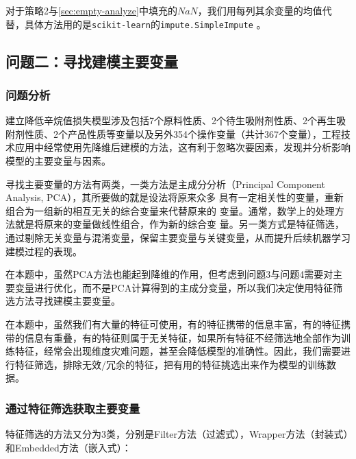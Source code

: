 \documentclass[bwprint]{gmcmthesis}
\begin{document}
对于策略2与\ref{sec:empty-analyze}中填充的$NaN$，我们用每列其余变量的均值代替，具体方法用的是\texttt{scikit-learn}的\texttt{impute.SimpleImpute} 。

\FloatBarrier
\subsection{问题二：寻找建模主要变量}
\FloatBarrier
\subsubsection{问题分析}

建立降低辛烷值损失模型涉及包括7个原料性质、2个待生吸附剂性质、2个再生吸附剂性质、2个产品性质等变量以及另外354个操作变量（共计367个变量），工程技术应用中经常使用先降维后建模的方法，这有利于忽略次要因素，发现并分析影响模型的主要变量与因素。

寻找主要变量的方法有两类，一类方法是主成分分析（Principal Component Analysis, PCA），其所要做的就是设法将原来众多
具有一定相关性的变量，重新组合为一组新的相互无关的综合变量来代替原来的
变量。通常，数学上的处理方法就是将原来的变量做线性组合，作为新的综合变
量。另一类方式是特征筛选，通过剔除无关变量与混淆变量，保留主要变量与关键变量，从而提升后续机器学习建模过程的表现。

在本题中，虽然PCA方法也能起到降维的作用，但考虑到问题3与问题4需要对主要变量进行优化，而不是PCA计算得到的主成分变量，所以我们决定使用特征筛选方法寻找建模主要变量。

在本题中，虽然我们有大量的特征可使用，有的特征携带的信息丰富，有的特征携带的信息有重叠，有的特征则属于无关特征，如果所有特征不经筛选地全部作为训练特征，经常会出现维度灾难问题，甚至会降低模型的准确性。因此，我们需要进行特征筛选，排除无效/冗余的特征，把有用的特征挑选出来作为模型的训练数据。



\FloatBarrier
\subsubsection{通过特征筛选获取主要变量}

特征筛选的方法又分为3类，分别是Filter方法（过滤式），Wrapper方法（封装式）和Embedded方法（嵌入式）：
\end{document}
